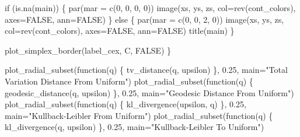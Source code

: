 \documentclass[
  letterpaper,
  DIV=11,
  numbers=noendperiod]{scrartcl}
\newenvironment{Shaded}{\begin{snugshade}}{\end{snugshade}}
\newcommand{\AttributeTok}[1]{\textcolor[rgb]{0.40,0.45,0.13}{#1}}
\newcommand{\ConstantTok}[1]{\textcolor[rgb]{0.56,0.35,0.01}{#1}}
\newcommand{\ControlFlowTok}[1]{\textcolor[rgb]{0.00,0.23,0.31}{#1}}
\newcommand{\DecValTok}[1]{\textcolor[rgb]{0.68,0.00,0.00}{#1}}
\newcommand{\FloatTok}[1]{\textcolor[rgb]{0.68,0.00,0.00}{#1}}
\newcommand{\FunctionTok}[1]{\textcolor[rgb]{0.28,0.35,0.67}{#1}}
\newcommand{\NormalTok}[1]{\textcolor[rgb]{0.00,0.23,0.31}{#1}}
\newcommand{\StringTok}[1]{\textcolor[rgb]{0.13,0.47,0.30}{#1}}
\begin{document}
\begin{Shaded}
\begin{Highlighting}[]
  \ControlFlowTok{if}\NormalTok{ (}\FunctionTok{is.na}\NormalTok{(main)) \{}
    \FunctionTok{par}\NormalTok{(}\AttributeTok{mar =} \FunctionTok{c}\NormalTok{(}\DecValTok{0}\NormalTok{, }\DecValTok{0}\NormalTok{, }\DecValTok{0}\NormalTok{, }\DecValTok{0}\NormalTok{))}
    \FunctionTok{image}\NormalTok{(xs, ys, zs, }\AttributeTok{col=}\FunctionTok{rev}\NormalTok{(cont\_colors), }\AttributeTok{axes=}\ConstantTok{FALSE}\NormalTok{, }\AttributeTok{ann=}\ConstantTok{FALSE}\NormalTok{)}
\NormalTok{  \} }\ControlFlowTok{else}\NormalTok{ \{}
    \FunctionTok{par}\NormalTok{(}\AttributeTok{mar =} \FunctionTok{c}\NormalTok{(}\DecValTok{0}\NormalTok{, }\DecValTok{0}\NormalTok{, }\DecValTok{2}\NormalTok{, }\DecValTok{0}\NormalTok{))}
    \FunctionTok{image}\NormalTok{(xs, ys, zs, }\AttributeTok{col=}\FunctionTok{rev}\NormalTok{(cont\_colors), }\AttributeTok{axes=}\ConstantTok{FALSE}\NormalTok{, }\AttributeTok{ann=}\ConstantTok{FALSE}\NormalTok{)}
    \FunctionTok{title}\NormalTok{(main)}
\NormalTok{  \}}

  \FunctionTok{plot\_simplex\_border}\NormalTok{(label\_cex, C, }\ConstantTok{FALSE}\NormalTok{)}
\NormalTok{\}}
\end{Highlighting}
\end{Shaded}

\begin{Shaded}
\begin{Highlighting}[]
\FunctionTok{plot\_radial\_subset}\NormalTok{(}\ControlFlowTok{function}\NormalTok{(q) \{ }\FunctionTok{tv\_distance}\NormalTok{(q, upsilon) \},}
                   \FloatTok{0.25}\NormalTok{, }\AttributeTok{main=}\StringTok{"Total Variation Distance From Uniform"}\NormalTok{)}
\FunctionTok{plot\_radial\_subset}\NormalTok{(}\ControlFlowTok{function}\NormalTok{(q) \{ }\FunctionTok{geodesic\_distance}\NormalTok{(q, upsilon) \},}
                   \FloatTok{0.25}\NormalTok{, }\AttributeTok{main=}\StringTok{"Geodesic Distance From Uniform"}\NormalTok{)}
\FunctionTok{plot\_radial\_subset}\NormalTok{(}\ControlFlowTok{function}\NormalTok{(q) \{ }\FunctionTok{kl\_divergence}\NormalTok{(upsilon, q) \},}
                   \FloatTok{0.25}\NormalTok{, }\AttributeTok{main=}\StringTok{"Kullback{-}Leibler From Uniform"}\NormalTok{)}
\FunctionTok{plot\_radial\_subset}\NormalTok{(}\ControlFlowTok{function}\NormalTok{(q) \{ }\FunctionTok{kl\_divergence}\NormalTok{(q, upsilon) \},}
                   \FloatTok{0.25}\NormalTok{, }\AttributeTok{main=}\StringTok{"Kullback{-}Leibler To Uniform"}\NormalTok{)}
\end{Highlighting}
\end{Shaded}
\end{document}

